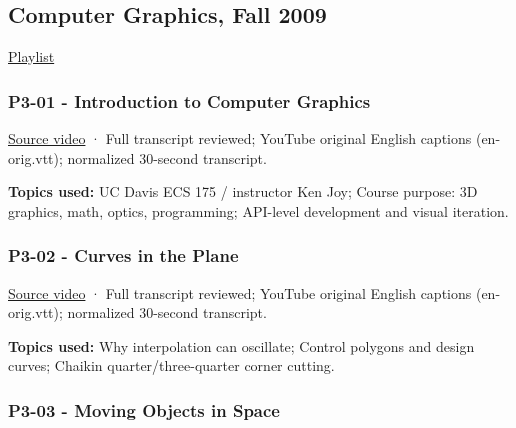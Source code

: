 \subsection{Computer Graphics, Fall 2009}\label{04-visual-computing-ii-ch036-computer-graphics-fall-2009}

\hypertarget{04-visual-computing-ii-ch036-computer-graphics-fall-2009}{}

\href{https://www.youtube.com/playlist?list=PL_w_qWAQZtAZhtzPI5pkAtcUVgmzdAP8g}{Playlist}

\subsubsection{P3-01 - Introduction to Computer Graphics}\label{04-visual-computing-ii-ch036-p3-01---introduction-to-computer-graphics}

\hypertarget{04-visual-computing-ii-ch036-p3-01---introduction-to-computer-graphics}{}

\href{https://www.youtube.com/watch?v=01YSK5gIEYQ}{Source video} · Full transcript reviewed; YouTube original English captions (en-orig.vtt); normalized 30-second transcript.

\textbf{Topics used:} UC Davis ECS 175 / instructor Ken Joy; Course purpose: 3D graphics, math, optics, programming; API-level development and visual iteration.

\subsubsection{P3-02 - Curves in the Plane}\label{04-visual-computing-ii-ch036-p3-02---curves-in-the-plane}

\hypertarget{04-visual-computing-ii-ch036-p3-02---curves-in-the-plane}{}

\href{https://www.youtube.com/watch?v=0NbD-c0Ctdk}{Source video} · Full transcript reviewed; YouTube original English captions (en-orig.vtt); normalized 30-second transcript.

\textbf{Topics used:} Why interpolation can oscillate; Control polygons and design curves; Chaikin quarter/three-quarter corner cutting.

\subsubsection{P3-03 - Moving Objects in Space}\label{04-visual-computing-ii-ch036-p3-03---moving-objects-in-space}

\hypertarget{04-visual-computing-ii-ch036-p3-03---moving-objects-in-space}{}

